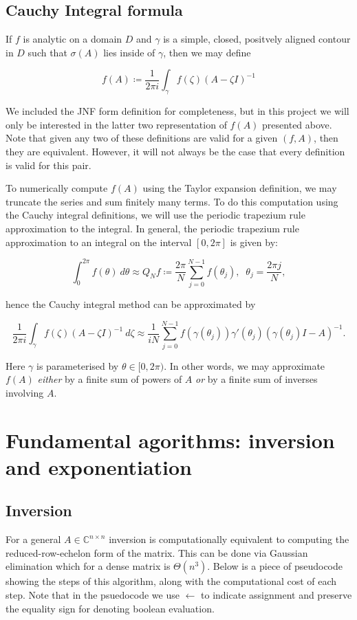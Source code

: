 \documentclass{article}
\newcommand{\bC}{\mathbb{C}}
\begin{document}
\subsection{Cauchy Integral formula}

If $f$ is analytic on a domain $D$ and $\gamma$ is  a simple, closed, positvely aligned contour in $D$ such that $\sigma(A)$ lies inside of $\gamma$, then we may define

\begin{equation}
  f(A) \coloneqq \frac{1}{2\pi i}\int_{\gamma} f(\zeta)(A - \zeta I)^{-1}
\end{equation}

We included the JNF form definition for completeness, but in this project we will only be interested in the latter two representation of $f(A)$ presented above. Note that given any two of these definitions are valid for a given $(f,A)$, then they are equivalent. However, it will not always be the case that every definition is valid for this pair.

To numerically compute $f(A)$ using the Taylor expansion definition, we may truncate the series and sum finitely many terms. To do this computation using the Cauchy integral definitions, we will use the periodic trapezium rule approximation to the integral. In general, the periodic trapezium rule approximation to an integral on the interval $[0,2\pi]$ is given by:

$$ \int_0^{2\pi} f(\theta) \: d\theta \approx Q_Nf \coloneqq \frac{2\pi}{N}\sum_{j=0}^{N-1}f(\theta_j), \; \; \theta_j = \frac{2\pi j}{N},$$

hence the Cauchy integral method can be approximated by

$$ \frac{1}{2\pi i} \int_\gamma f(\zeta)(A - \zeta I)^{-1}
\: d\zeta \approx \frac{1}{iN}\sum_{j=0}^{N-1} f\left(\gamma(\theta_j)\right)\gamma'(\theta_j)(\gamma(\theta_j)I - A)^{-1}.$$

Here $\gamma$ is parameterised by $\theta \in [0,2\pi)$. In other words, we may approximate $f(A)$ \textit{either} by a finite sum of powers of $A$ \textit{or} by a finite sum of inverses involving $A$.
\section{Fundamental agorithms: inversion and exponentiation}

\subsection{Inversion}
For a general $A \in \bC^{n \times n}$ inversion is computationally equivalent to computing the reduced-row-echelon form of the matrix. This can be done via Gaussian elimination which for a dense matrix is $\Theta(n^3)$. Below is a piece of pseudocode showing the steps of this algorithm, along with the computational cost of each step. Note that in the psuedocode we use $\gets$ to indicate assignment and preserve the equality sign for denoting boolean evaluation.
\end{document}
